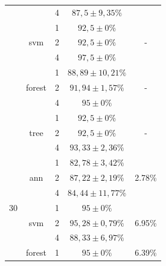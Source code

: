 \begin{table}[]
\begin{tabular}{|c|c|c|c|c|}
                      &                         & 4                & $ 87,5 \pm 9,35 \% $    &\\ \cline{2-5} 
                      & \multirow{3}{*}{svm}    & 1                & $ 92,5 \pm 0 \% $       & \multirow{3}{*}{-} \\ \cline{3-4} 
                      &                         & 2                & $ 92,5 \pm 0 \% $       &\\ \cline{3-4} 
                      &                         & 4                & $ 97,5 \pm 0 \% $       &\\ \cline{2-5} 
                      & \multirow{3}{*}{forest} & 1                & $ 88,89 \pm 10,21 \% $  & \multirow{3}{*}{-} \\ \cline{3-4} 
                      &                         & 2                & $ 91,94 \pm 1,57 \% $  & \\ \cline{3-4} 
                      &                         & 4                & $ 95 \pm 0 \% $         &\\ \cline{2-5} 
                      & \multirow{3}{*}{tree}   & 1                & $ 92,5 \pm 0 \% $       & \multirow{3}{*}{-} \\ \cline{3-4} 
                      &                         & 2                & $ 92,5 \pm 0 \% $       &\\ \cline{3-4} 
                      &                         & 4                & $ 93,33 \pm 2,36 \% $   &\\ \hline
\multirow{12}{*}{30}  & \multirow{3}{*}{ann}    & 1                & $ 82,78 \pm 3,42 \% $   & \multirow{3}{*}{2.78\%} \\ \cline{3-4} 
                      &                         & 2                & $ 87,22 \pm 2,19 \% $  & \\ \cline{3-4} 
                      &                         & 4                & $ 84,44 \pm 11,77 \% $  &\\ \cline{2-5} 
                      & \multirow{3}{*}{svm}    & 1                & $ 95 \pm 0 \% $        & \multirow{3}{*}{6.95\%} \\ \cline{3-4} 
                      &                         & 2                & $ 95,28 \pm 0,79 \% $   &\\ \cline{3-4} 
                      &                         & 4                & $ 88,33 \pm 6,97 \% $   &\\ \cline{2-5} 
                      & \multirow{3}{*}{forest} & 1                & $ 95 \pm 0 \%  $        & \multirow{3}{*}{6.39\%} \\ \cline{3-4} 

\end{tabular}
\end{table}
